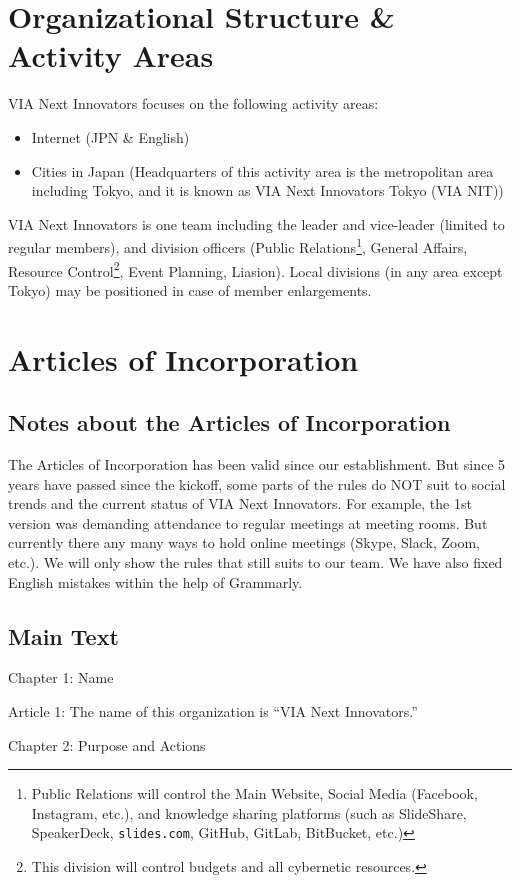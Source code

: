 \documentclass[dvipdfmx]{article}
\begin{document}
\section{Organizational Structure \& Activity Areas}
VIA Next Innovators focuses on the following activity areas:
\begin{itemize}
\item Internet (JPN \& English)
\item Cities in Japan (Headquarters of this activity area is the metropolitan area including Tokyo, and it is known as VIA Next Innovators Tokyo (VIA NIT))
\end{itemize}
VIA Next Innovators is one team including the leader and vice-leader (limited to regular members), and division officers (Public Relations\footnote{Public Relations will control the Main Website, Social Media (Facebook, Instagram, etc.), and knowledge sharing platforms (such as SlideShare, SpeakerDeck, \texttt{slides.com}, GitHub, GitLab, BitBucket, etc.)}, General Affairs, Resource Control\footnote{This division will control budgets and all cybernetic resources.}, Event Planning, Liasion). Local divisions (in any area except Tokyo) may be positioned in case of member enlargements.
\section{Articles of Incorporation}
\subsection{Notes about the Articles of Incorporation}
The Articles of Incorporation has been valid since our establishment. But since 5 years have passed since the kickoff, some parts of the rules do NOT suit to social trends and the current status of VIA Next Innovators. For example, the 1st version was demanding attendance to regular meetings at meeting rooms. But currently there any many ways to hold online meetings (Skype, Slack, Zoom, etc.). We will only show the rules that still suits to our team. We have also fixed English mistakes within the help of Grammarly.
\subsection{Main Text}
\begin{center}
Chapter 1: Name
\end{center}
Article 1: The name of this organization is “VIA Next Innovators.”
\par
\begin{center}
Chapter 2: Purpose and Actions
\end{center}
\end{document}
